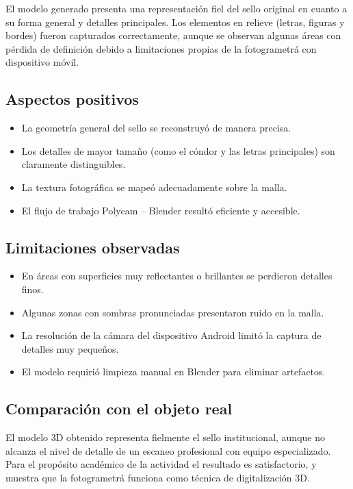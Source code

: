 \documentclass[12pt,a4paper]{article}
\begin{document}
El modelo generado presenta una representaci\'on fiel del sello original en cuanto a su forma general y detalles principales. Los elementos en relieve (letras, figuras y bordes) fueron capturados correctamente, aunque se observan algunas \'areas con p\'erdida de definici\'on debido a limitaciones propias de la fotogrametr\'a con dispositivo m\'ovil.

\subsection{Aspectos positivos}

\begin{itemize}
    \item La geometr\'ia general del sello se reconstruy\'o de manera precisa.
    \item Los detalles de mayor tama\~no (como el c\'ondor y las letras principales) son claramente distinguibles.
    \item La textura fotogr\'afica se mape\'o adecuadamente sobre la malla.
    \item El flujo de trabajo Polycam -- Blender result\'o eficiente y accesible.
\end{itemize}

\subsection{Limitaciones observadas}

\begin{itemize}
    \item En \'areas con superficies muy reflectantes o brillantes se perdieron detalles finos.
    \item Algunas zonas con sombras pronunciadas presentaron ruido en la malla.
    \item La resoluci\'on de la c\'amara del dispositivo Android limit\'o la captura de detalles muy peque\~nos.
    \item El modelo requiri\'o limpieza manual en Blender para eliminar artefactos.
\end{itemize}

\subsection{Comparaci\'on con el objeto real}

El modelo 3D obtenido representa fielmente el sello institucional, aunque no alcanza el nivel de detalle de un escaneo profesional con equipo especializado. Para el prop\'osito acad\'emico de la actividad el resultado es satisfactorio, y muestra que la fotogrametr\'a funciona como t\'ecnica de digitalizaci\'on 3D.
\end{document}
